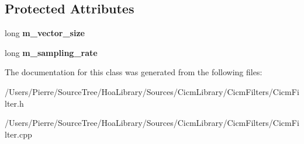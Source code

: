 \subsection*{Protected Attributes}
\begin{DoxyCompactItemize}
\item 
\hypertarget{class_filter_af9ca666c9fe182e676238dac04429954}{long {\bfseries m\-\_\-vector\-\_\-size}}\label{class_filter_af9ca666c9fe182e676238dac04429954}

\item 
\hypertarget{class_filter_a320edddf1bc2586ac19c9f5cd833bd82}{long {\bfseries m\-\_\-sampling\-\_\-rate}}\label{class_filter_a320edddf1bc2586ac19c9f5cd833bd82}

\end{DoxyCompactItemize}


The documentation for this class was generated from the following files\-:\begin{DoxyCompactItemize}
\item 
/\-Users/\-Pierre/\-Source\-Tree/\-Hoa\-Library/\-Sources/\-Cicm\-Library/\-Cicm\-Filters/Cicm\-Filter.\-h\item 
/\-Users/\-Pierre/\-Source\-Tree/\-Hoa\-Library/\-Sources/\-Cicm\-Library/\-Cicm\-Filters/Cicm\-Filter.\-cpp\end{DoxyCompactItemize}
